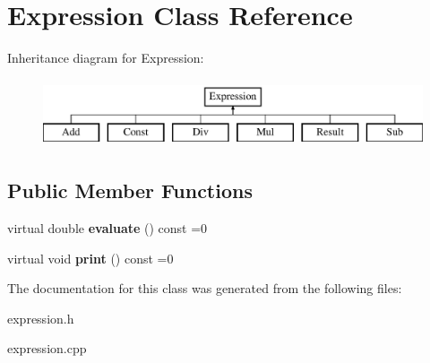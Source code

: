 \hypertarget{class_expression}{}\section{Expression Class Reference}
\label{class_expression}
Inheritance diagram for Expression\+:\begin{figure}[H]
\begin{center}
\leavevmode
\includegraphics[height=2.000000cm]{class_expression}
\end{center}
\end{figure}
\subsection*{Public Member Functions}
\begin{DoxyCompactItemize}
\item 
\mbox{\label{class_expression_a9e2b69592a66b920d052f5e12e1ddb70}} 
virtual double {\bfseries evaluate} () const =0
\item 
\mbox{\label{class_expression_ae11e78376212134745e5fa9f0b91dbd1}} 
virtual void {\bfseries print} () const =0
\end{DoxyCompactItemize}


The documentation for this class was generated from the following files\+:\begin{DoxyCompactItemize}
\item 
expression.\+h\item 
expression.\+cpp\end{DoxyCompactItemize}
